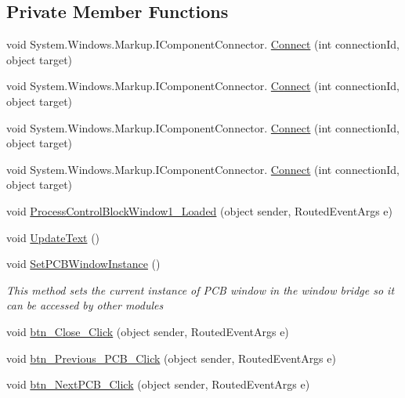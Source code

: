 \subsection*{Private Member Functions}
\begin{DoxyCompactItemize}
\item 
void System.\+Windows.\+Markup.\+I\+Component\+Connector. \hyperlink{class_c_p_u___o_s___simulator_1_1_process_control_block_window_aacad273b08eb9ad7e92c47eb5493008b}{Connect} (int connection\+Id, object target)
\item 
void System.\+Windows.\+Markup.\+I\+Component\+Connector. \hyperlink{class_c_p_u___o_s___simulator_1_1_process_control_block_window_aacad273b08eb9ad7e92c47eb5493008b}{Connect} (int connection\+Id, object target)
\item 
void System.\+Windows.\+Markup.\+I\+Component\+Connector. \hyperlink{class_c_p_u___o_s___simulator_1_1_process_control_block_window_aacad273b08eb9ad7e92c47eb5493008b}{Connect} (int connection\+Id, object target)
\item 
void System.\+Windows.\+Markup.\+I\+Component\+Connector. \hyperlink{class_c_p_u___o_s___simulator_1_1_process_control_block_window_aacad273b08eb9ad7e92c47eb5493008b}{Connect} (int connection\+Id, object target)
\item 
void \hyperlink{class_c_p_u___o_s___simulator_1_1_process_control_block_window_a18ccb30540f400cf07a224304c882c32}{Process\+Control\+Block\+Window1\+\_\+\+Loaded} (object sender, Routed\+Event\+Args e)
\item 
void \hyperlink{class_c_p_u___o_s___simulator_1_1_process_control_block_window_a9bb10e14d5a7e732ce6e5e5e0f66b678}{Update\+Text} ()
\item 
void \hyperlink{class_c_p_u___o_s___simulator_1_1_process_control_block_window_aa2c224432467974c6cf46c83a01735fa}{Set\+P\+C\+B\+Window\+Instance} ()
\begin{DoxyCompactList}\small\item\em This method sets the current instance of P\+C\+B window in the window bridge so it can be accessed by other modules \end{DoxyCompactList}\item 
void \hyperlink{class_c_p_u___o_s___simulator_1_1_process_control_block_window_a3b65012264c411aa3524bfb9b1e6bfe5}{btn\+\_\+\+Close\+\_\+\+Click} (object sender, Routed\+Event\+Args e)
\item 
void \hyperlink{class_c_p_u___o_s___simulator_1_1_process_control_block_window_a071ef7272a71ad3a0004c70bbcc4ad0a}{btn\+\_\+\+Previous\+\_\+\+P\+C\+B\+\_\+\+Click} (object sender, Routed\+Event\+Args e)
\item 
void \hyperlink{class_c_p_u___o_s___simulator_1_1_process_control_block_window_a752d089879e7d6aa80faef5ffc5f68cd}{btn\+\_\+\+Next\+P\+C\+B\+\_\+\+Click} (object sender, Routed\+Event\+Args e)
\end{DoxyCompactItemize}
